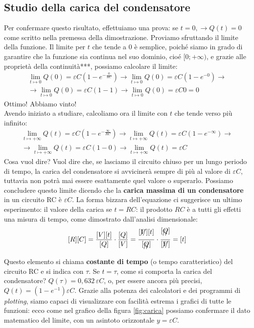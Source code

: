\documentclass[a3paper, twoside, openany]{book}
\theoremstyle{definition}
\begin{document}
\subsection{Studio della carica del condensatore}
Per confermare questo risultato, effettuiamo una prova: se $t=0,\longrightarrow Q(t)=0$ come scritto nella premessa della dimostrazione. Proviamo sfruttando il limite della funzione. Il limite per $t$ che tende a 0 è semplice, poiché siamo in grado di garantire che la funzione sia continua nel suo dominio, cioé $[0;+\infty)$, e grazie alle proprietà della continuità***, possiamo calcolare il limite: \begin{multline*}\lim_{t\mapsto 0}Q(0)=\varepsilon C \left(1-e^{-\frac{0}{RC}}\right)\longrightarrow \lim_{t\mapsto 0}Q(0)=\varepsilon C \left(1-e^{-0}\right)\longrightarrow \\\longrightarrow \lim_{t\mapsto 0}Q(0)=\varepsilon C (1-1)\longrightarrow \lim_{t\mapsto 0}Q(0)=\varepsilon C 0=0\end{multline*} Ottimo! Abbiamo vinto! \\ Avendo iniziato a studiare, calcoliamo ora il limite con $t$ che tende verso più infinito: \begin{multline*}\lim_{t\mapsto +\infty}Q(t)=\varepsilon C \left(1-e^{-\frac{\infty}{RC}}\right)\longrightarrow \lim_{t\mapsto +\infty}Q(t)=\varepsilon C \left(1-e^{-\infty}\right)\longrightarrow \\\longrightarrow \lim_{t\mapsto +\infty}Q(t)=\varepsilon C (1-0)\longrightarrow\lim_{t\mapsto +\infty} Q(t)=\varepsilon C\end{multline*} Cosa vuol dire? Vuol dire che, se lasciamo il circuito chiuso per un lungo periodo di tempo, la carica del condensatore si avvicinerà sempre di più al valore di $\varepsilon C$, tuttavia non potrà mai essere esattamente quel valore o superarlo. Possiamo concludere questo limite dicendo che la \textbf{carica massima di un condensatore} in un circuito RC è $\varepsilon C$. La forma bizzara dell'equazione ci suggerisce un ultimo esperimento: il valore della carica se $t=RC$: il prodotto $RC$ è a tutti gli effetti una misura di tempo, come dimostrato dall'analisi dimensionale:
$$[R][C]=\frac{[V][t]}{[Q]}\cdot\frac{[Q]}{[V]}=\frac{[\xout{V}][t]}{[\xout{Q}]} \cdot \frac{[\xout{Q}]}{[\xout{V}]}=[t]$$ Questo elemento si chiama \textbf{costante di tempo} (o tempo caratteristico) del circuito RC e si indica con $\tau$. Se $t=\tau$, come si comporta la carica del condensatore? $Q(\tau)=0,632\,\varepsilon C$, o, per essere ancora più precisi, $Q(t)=\left(1-e^{-1}\right) \varepsilon C$. Grazie alla potenza dei calcolatori e dei programmi di \emph{plotting}, siamo capaci di visualizzare con facilità estrema i grafici di tutte le funzioni: ecco come nel grafico della figura \ref{fig:carica} possiamo confermare il dato matematico del limite, con un asintoto orizzontale $y=\varepsilon C$.
\end{document}
